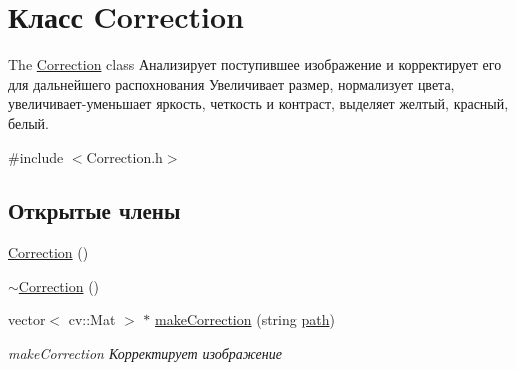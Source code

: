 \hypertarget{class_correction}{\section{Класс Correction}
\label{class_correction}
}


The \hyperlink{class_correction}{Correction} class Анализирует поступившее изображение и корректирует его для дальнейшего распохнования Увеличивает размер, нормализует цвета, увеличивает-\/уменьшает яркость, четкость и контраст, выделяет желтый, красный, белый.  




{\ttfamily \#include $<$Correction.\+h$>$}

\subsection*{Открытые члены}
\begin{DoxyCompactItemize}
\item 
\hyperlink{class_correction_ab2b5a19788aa1940ca828c450a5f5d4f}{Correction} ()
\item 
\hyperlink{class_correction_ad13cd5cc763e4cfced5595b1bb69e8dc}{$\sim$\+Correction} ()
\item 
vector$<$ cv\+::\+Mat $>$ $\ast$ \hyperlink{class_correction_a2a43e98d77beaf6fee39a6fe1bbfbb26}{make\+Correction} (string \hyperlink{class_correction_a6e1ccea5c33ea89d717d9227d17f625c}{path})
\begin{DoxyCompactList}\small\item\em make\+Correction Корректирует изображение \end{DoxyCompactList}\end{DoxyCompactItemize}
